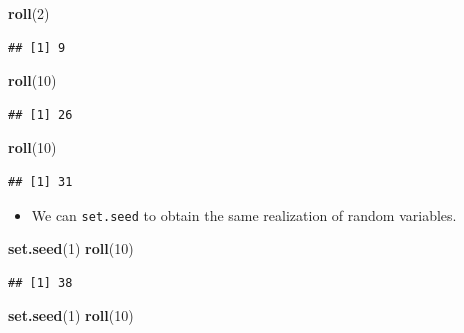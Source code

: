 \documentclass[]{book}
\newenvironment{Shaded}{\begin{snugshade}}{\end{snugshade}}
\newcommand{\KeywordTok}[1]{\textcolor[rgb]{0.13,0.29,0.53}{\textbf{#1}}}
\newcommand{\DecValTok}[1]{\textcolor[rgb]{0.00,0.00,0.81}{#1}}
\newcommand{\NormalTok}[1]{#1}
\providecommand{\tightlist}{%
  \setlength{\itemsep}{0pt}\setlength{\parskip}{0pt}}
\begin{document}
\begin{Shaded}
\begin{Highlighting}[]
\KeywordTok{roll}\NormalTok{(}\DecValTok{2}\NormalTok{)}
\end{Highlighting}
\end{Shaded}

\begin{verbatim}
## [1] 9
\end{verbatim}

\begin{Shaded}
\begin{Highlighting}[]
\KeywordTok{roll}\NormalTok{(}\DecValTok{10}\NormalTok{)}
\end{Highlighting}
\end{Shaded}

\begin{verbatim}
## [1] 26
\end{verbatim}

\begin{Shaded}
\begin{Highlighting}[]
\KeywordTok{roll}\NormalTok{(}\DecValTok{10}\NormalTok{)}
\end{Highlighting}
\end{Shaded}

\begin{verbatim}
## [1] 31
\end{verbatim}

\begin{itemize}
\tightlist
\item
  We can \texttt{set.seed} to obtain the same realization of random
  variables.
\end{itemize}

\begin{Shaded}
\begin{Highlighting}[]
\KeywordTok{set.seed}\NormalTok{(}\DecValTok{1}\NormalTok{)}
\KeywordTok{roll}\NormalTok{(}\DecValTok{10}\NormalTok{)}
\end{Highlighting}
\end{Shaded}

\begin{verbatim}
## [1] 38
\end{verbatim}

\begin{Shaded}
\begin{Highlighting}[]
\KeywordTok{set.seed}\NormalTok{(}\DecValTok{1}\NormalTok{)}
\KeywordTok{roll}\NormalTok{(}\DecValTok{10}\NormalTok{)}
\end{Highlighting}
\end{Shaded}
\end{document}
